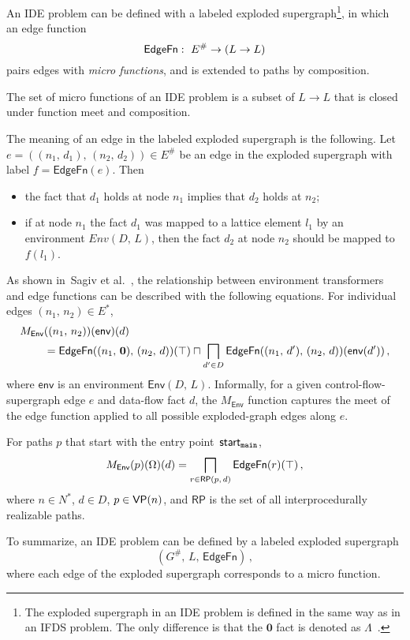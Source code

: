 {An IDE problem can be defined with a labeled exploded supergraph\footnote{
    The exploded supergraph in an IDE problem is defined in the same way as in an IFDS problem. The only difference is that the $\mathbf0$ fact is denoted as $\Lambda$~\cite{reps1995precise,sagiv1996precise}.
}, in which an edge function
\begin{equation}
  \textsf{EdgeFn}:\ E^\#\to(L\to L)
\end{equation}
pairs edges with \textit{micro functions}, and is extended to paths by composition.

The set of micro functions of an IDE problem is a subset of $L\to L$ that is closed under function meet and composition.

The meaning of an edge in the labeled exploded supergraph is the following. Let $e=((n_1,\,d_1),\,(n_2,\,d_2))\in E^\#$ be an edge in the exploded supergraph with label $f=\mathsf{EdgeFn}(e)$. Then
\begin{itemize}
	\item the fact that $d_1$ holds at node $n_1$ implies that $d_2$ holds at $n_2$;
  \item if at node $n_1$ the fact $d_1$ was mapped to a lattice element $l_1$ by an environment $Env(D,\,L)$, then the fact $d_2$ at node $n_2$ should be mapped to $f(l_1)$.
\end{itemize}

As shown in~Sagiv et al.~\cite{sagiv1996precise}, the relationship between environment transformers and edge functions can be described with the following equations. For individual edges $(n_1,\,n_2)\in E^*$,
\begin{align}\label{eq:envTransToEdgeFnEdge}
  M_\textsf{Env}&((n_1,\,n_2))(\textsf{env})(d)\notag\\
  &=\textsf{EdgeFn}((n_1,\,\mathbf0),\,(n_2,\,d))(\top)\sqcap\bigsqcap_{d'\in D}\textsf{EdgeFn}((n_1,\,d'),\,(n_2,\,d))(\textsf{env}(d'))\,,
\end{align}
where $\textsf{env}$ is an environment $\textsf{Env}(D,\,L)$. Informally, for a given control-flow-supergraph edge $e$ and data-flow fact $d$, the $M_\textsf{Env}$ function captures the meet of the edge function applied to all possible exploded-graph edges along $e$.

For paths $p$ that start with the entry point~$\textsf{start}_\texttt{main}$,
\begin{equation}\label{eq:envTransToEdgefn}
  M_\textsf{Env}(p)(\Omega)(d)=\bigsqcap_{r\in\mathsf{RP}(p,\,d)}\textsf{EdgeFn}(r)(\top)\,,
\end{equation}
where $n\in N^*$, $d\in D$, $p\in\textsf{VP}(n)$, and $\mathsf{RP}$ is the set of all interprocedurally realizable paths.

To summarize, an IDE problem can be defined by a labeled exploded supergraph 
\begin{equation}(G^\#,\,L,\,\mathsf{EdgeFn})\,,\end{equation}
where each edge of the exploded supergraph corresponds to a micro function.
}


